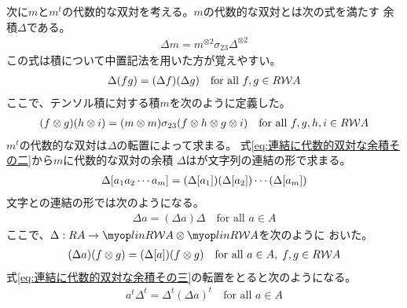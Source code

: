 	次に$m$と$m^t$の代数的な双対を考える。$m$の代数的な双対とは次の式を満たす
	余積$\Delta$である。
	\begin{equation}\label{eq:連結に代数的双対な余積}\begin{split} %
		\Delta m = m^{\otimes2}\sigma_{23}\Delta^{\otimes2}
	\end{split}\end{equation} %
	この式は積について中置記法を用いた方が覚えやすい。
	\begin{equation}\label{eq:連結に代数的双対な余積その二}\begin{split} %
		\Delta(fg) = (\Delta f)(\Delta g)
		\quad\text{for all }f,g\in R\Word{A}
	\end{split}\end{equation} %
	ここで、テンソル積に対する積$m$を次のように定義した。
	\begin{equation*}\begin{split} %
		(f\otimes g)(h\otimes i)
		= (m\otimes m)\sigma_{23}(f\otimes h\otimes g\otimes i)
		\quad\text{for all }f,g,h,i\in R\Word{A}
	\end{split}\end{equation*} %
	$m^t$の代数的な双対は$\Delta$の転置によって求まる。
	式\eqref{eq:連結に代数的双対な余積その二}から$m$に代数的な双対の余積
	$\Delta$はが文字列の連結の形で求まる。
	\begin{equation}\label{eq:連結に代数的双対な余積の具体形}\begin{split} %
		\Delta\word{a_1a_2\cdots a_m} 
		= (\Delta\word{a_1})(\Delta\word{a_2})\cdots(\Delta\word{a_m})
	\end{split}\end{equation} %
	文字との連結の形では次のようになる。
	\begin{equation}\label{eq:連結に代数的双対な余積その三}\begin{split} %
		\Delta a = (\Delta a)\Delta \quad\text{for all }a\in A
	\end{split}\end{equation} %
	ここで、$\Delta:RA\to \lin{R\Word{A}}\otimes\lin{R\Word{A}}$を次のように
	おいた。
	\begin{equation*}\begin{split} %
		(\Delta a)(f\otimes g) = (\Delta\word{a})(f\otimes g) 
		\quad\text{for all }a\in A,\;f,g\in R\Word{A}
	\end{split}\end{equation*} %
	式\eqref{eq:連結に代数的双対な余積その三}の転置をとると次のようになる。
	\begin{equation*}\begin{split} %
		a^t\Delta^t = \Delta^t(\Delta a)^t \quad\text{for all }a\in A
	\end{split}\end{equation*} %

